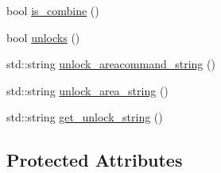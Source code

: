 \begin{DoxyCompactItemize}
\item 
bool \hyperlink{class_item_command_a71023af77dc1cae418995588e1fead9d}{is\-\_\-combine} ()
\item 
bool \hyperlink{class_item_command_a74c82a6f88120d2ccaa6fbba4353fe17}{unlocks} ()
\item 
std\-::string \hyperlink{class_item_command_a9d663365564ebb4c7ed39ce73d995631}{unlock\-\_\-areacommand\-\_\-string} ()
\item 
std\-::string \hyperlink{class_item_command_a08a215a5fab2593301ca90ed794267d7}{unlock\-\_\-area\-\_\-string} ()
\item 
std\-::string \hyperlink{class_item_command_ab13f510d664339b267fc721622ab671a}{get\-\_\-unlock\-\_\-string} ()
\end{DoxyCompactItemize}
\subsection*{\-Protected \-Attributes}
